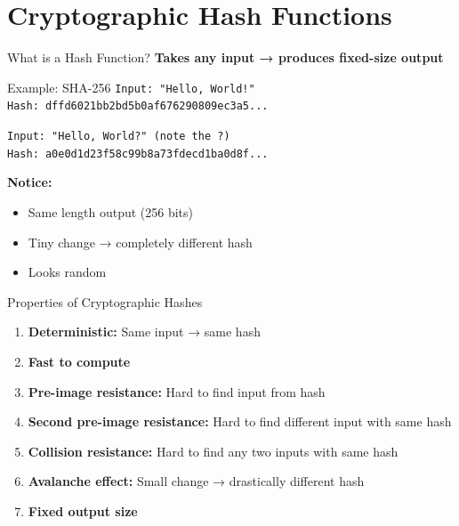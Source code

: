\documentclass{beamer}
\begin{document}
\section{Cryptographic Hash Functions}

\begin{frame}[fragile]{What is a Hash Function?}
\textbf{Takes any input → produces fixed-size output}

\vspace{0.3cm}
\begin{exampleblock}{Example: SHA-256}
\texttt{Input: "Hello, World!"}\\
\texttt{Hash: dffd6021bb2bd5b0af676290809ec3a5...}

\vspace{0.2cm}
\texttt{Input: "Hello, World?" (note the ?)}\\
\texttt{Hash: a0e0d1d23f58c99b8a73fdecd1ba0d8f...}
\end{exampleblock}

\vspace{0.3cm}
\textbf{Notice:}
\begin{itemize}
    \item Same length output (256 bits)
    \item Tiny change → completely different hash
    \item Looks random
\end{itemize}

\end{frame}

\begin{frame}{Properties of Cryptographic Hashes}
\begin{enumerate}
    \item \textbf{Deterministic:} Same input → same hash
    \item \textbf{Fast to compute}
    \item \textbf{Pre-image resistance:} Hard to find input from hash
    \item \textbf{Second pre-image resistance:} Hard to find different input with same hash
    \item \textbf{Collision resistance:} Hard to find any two inputs with same hash
    \item \textbf{Avalanche effect:} Small change → drastically different hash
    \item \textbf{Fixed output size}
\end{enumerate}
\end{frame}
\end{document}
